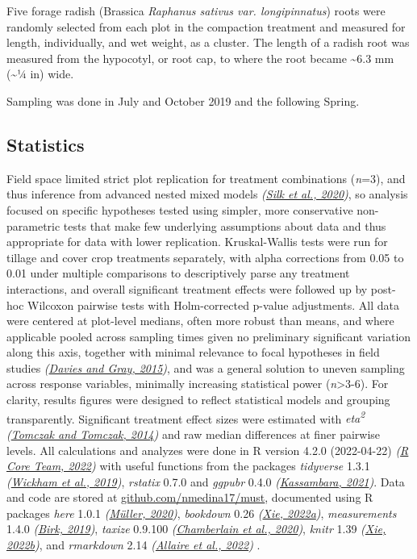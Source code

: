 \documentclass[
  12pt,
]{article}
\begin{document}
Five forage radish (Brassica \emph{Raphanus sativus var. longipinnatus}) roots were randomly selected from each plot in the compaction treatment and measured for length, individually, and wet weight, as a cluster.
The length of a radish root was measured from the hypocotyl, or root cap, to where the root became \textasciitilde6.3 mm (\textasciitilde1⁄4 in) wide.

Sampling was done in July and October 2019 and the following Spring.

\hypertarget{statistics}{%
\subsection{Statistics}\label{statistics}}

Field space limited strict plot replication for treatment combinations (\emph{n}=3), and thus inference from advanced nested mixed models \emph{(\protect\hyperlink{ref-silk20}{Silk et al., 2020})}, so analysis focused on specific hypotheses tested using simpler, more conservative non-parametric tests that make few underlying assumptions about data and thus appropriate for data with lower replication.
Kruskal-Wallis tests were run for tillage and cover crop treatments separately, with alpha corrections from 0.05 to 0.01 under multiple comparisons to descriptively parse any treatment interactions, and overall significant treatment effects were followed up by post-hoc Wilcoxon pairwise tests with Holm-corrected p-value adjustments.
All data were centered at plot-level medians, often more robust than means, and where applicable pooled across sampling times given no preliminary significant variation along this axis, together with minimal relevance to focal hypotheses in field studies \emph{(\protect\hyperlink{ref-davies15b}{Davies and Gray, 2015})}, and was a general solution to uneven sampling across response variables, minimally increasing statistical power (\emph{n}\textgreater3-6).
For clarity, results figures were designed to reflect statistical models and grouping transparently.
Significant treatment effect sizes were estimated with \emph{eta\textsuperscript{2}} \emph{(\protect\hyperlink{ref-tomczak14}{Tomczak and Tomczak, 2014})} and raw median differences at finer pairwise levels.
All calculations and analyzes were done in R version 4.2.0 (2022-04-22) \emph{(\protect\hyperlink{ref-base}{R Core Team, 2022})} with useful functions from the packages \emph{tidyverse} 1.3.1 \emph{(\protect\hyperlink{ref-tidyverse}{Wickham et al., 2019})}, \emph{rstatix} 0.7.0 and \emph{ggpubr} 0.4.0 \emph{(\protect\hyperlink{ref-rstatix}{Kassambara, 2021})}.
Data and code are stored at \url{github.com/nmedina17/must},
documented using R packages
\emph{here} 1.0.1 \emph{(\protect\hyperlink{ref-here}{Müller, 2020})},
\emph{bookdown} 0.26 \emph{(\protect\hyperlink{ref-bookdown2022}{Xie, 2022a})},
\emph{measurements} 1.4.0 \emph{(\protect\hyperlink{ref-measurements}{Birk, 2019})},
\emph{taxize} 0.9.100 \emph{(\protect\hyperlink{ref-taxize2020}{Chamberlain et al., 2020})},
\emph{knitr} 1.39 \emph{(\protect\hyperlink{ref-knitr2022}{Xie, 2022b})}, and
\emph{rmarkdown} 2.14 \emph{(\protect\hyperlink{ref-rmarkdown2022}{Allaire et al., 2022})}
.
\end{document}
